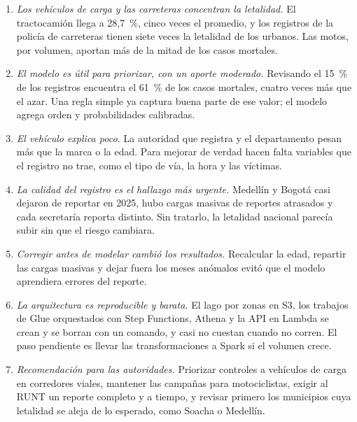 \documentclass[11pt,a4paper]{article}
\begin{document}
\begin{enumerate}
  \item \textit{Los vehículos de carga y las carreteras concentran la letalidad.} El tractocamión llega a 28,7~\%, cinco veces el promedio, y los registros de la policía de carreteras tienen siete veces la letalidad de los urbanos. Las motos, por volumen, aportan más de la mitad de los casos mortales.
  \item \textit{El modelo es útil para priorizar, con un aporte moderado.} Revisando el 15~\% de los registros encuentra el 61~\% de los casos mortales, cuatro veces más que el azar. Una regla simple ya captura buena parte de ese valor; el modelo agrega orden y probabilidades calibradas.
  \item \textit{El vehículo explica poco.} La autoridad que registra y el departamento pesan más que la marca o la edad. Para mejorar de verdad hacen falta variables que el registro no trae, como el tipo de vía, la hora y las víctimas.
  \item \textit{La calidad del registro es el hallazgo más urgente.} Medellín y Bogotá casi dejaron de reportar en 2025, hubo cargas masivas de reportes atrasados y cada secretaría reporta distinto. Sin tratarlo, la letalidad nacional parecía subir sin que el riesgo cambiara.
  \item \textit{Corregir antes de modelar cambió los resultados.} Recalcular la edad, repartir las cargas masivas y dejar fuera los meses anómalos evitó que el modelo aprendiera errores del reporte.
  \item \textit{La arquitectura es reproducible y barata.} El lago por zonas en S3, los trabajos de Glue orquestados con Step Functions, Athena y la API en Lambda se crean y se borran con un comando, y casi no cuestan cuando no corren. El paso pendiente es llevar las transformaciones a Spark si el volumen crece.
  \item \textit{Recomendación para las autoridades.} Priorizar controles a vehículos de carga en corredores viales, mantener las campañas para motociclistas, exigir al RUNT un reporte completo y a tiempo, y revisar primero los municipios cuya letalidad se aleja de lo esperado, como Soacha o Medellín.
\end{enumerate}

\end{document}
